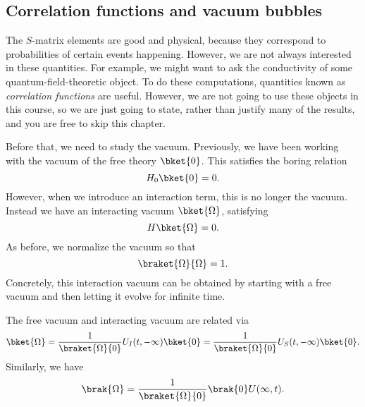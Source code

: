\documentclass[a4paper]{article}
\begin{document}
%
%
\subsection{Correlation functions and vacuum bubbles}
The $S$-matrix elements are good and physical, because they correspond to probabilities of certain events happening. However, we are not always interested in these quantities. For example, we might want to ask the conductivity of some quantum-field-theoretic object. To do these computations, quantities known as \emph{correlation functions} are useful. However, we are not going to use these objects in this course, so we are just going to state, rather than justify many of the results, and you are free to skip this chapter.

Before that, we need to study the vacuum. Previously, we have been working with the vacuum of the free theory $\bket{0}$. This satisfies the boring relation
\[
  H_0 \bket{0} = 0.
\]
However, when we introduce an interaction term, this is no longer the vacuum. Instead we have an interacting vacuum $\bket{\Omega}$, satisfying
\[
  H \bket{\Omega} = 0.
\]
As before, we normalize the vacuum so that
\[
  \braket{\Omega}{\Omega} = 1.
\]
Concretely, this interaction vacuum can be obtained by starting with a free vacuum and then letting it evolve for infinite time.
\begin{lemma}
  The free vacuum and interacting vacuum are related via
  \[
    \bket{\Omega} = \frac{1}{\braket{\Omega}{0}} U_I(t, -\infty)\bket{0} = \frac{1}{\braket{\Omega}{0}} U_S(t, -\infty)\bket{0}.
  \]
Similarly, we have
  \[
    \brak{\Omega} = \frac{1}{\braket{\Omega}{0}} \brak{0}U(\infty, t).
  \]
\end{lemma}
\end{document}

